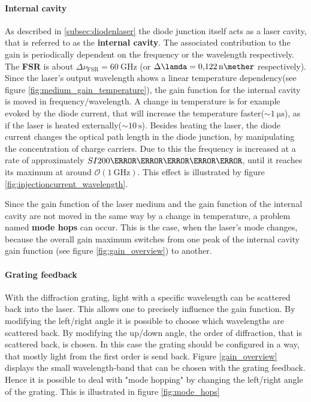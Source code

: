 \paragraph{Internal cavity}
As described in \ref{subsec:diodenlaser} the diode junction itself
acts as a laser cavity, that is referred to as the \textbf{internal cavity}.
The associated contribution to the gain is periodically dependent on
the frequency or the wavelength respectively. The \textbf{FSR} is about
$\Delta\nu_{\text{FSR}} = \SI{60}{\giga\hertz}$ (or
$\Delta\lamda = \SI{0.122}{\nano\mether}$ respectively).
Since the laser's output wavelength shows a linear
temperature dependency(see figure \ref{fig:medium_gain_temperature}),
the gain function for the internal cavity is moved in frequency$/$wavelength.
A change in temperature is for example evoked by the diode current,
that will increase the temperature faster($\sim \SI{1}{\micro\second}$),
as if the laser is heated externally($\sim \SI{10}{\second}$).
Besides heating the laser, the diode current changes the optical
path length in the diode junction, by manipulating the concentration
of charge carriers. Due to this the frequency is increased at a rate of
approximately $SI{200}{\mega\hertz\per\milli\ampere}$, until it reaches
its maximum at around $\mathcal{O}(\SI{1}{\giga\hertz})$.
This effect is illustrated by figure \ref{fig:injectioncurrent_wavelength}.


Since the gain function of the laser medium and the gain function of
the internal cavity are not moved in the same way by a change in temperature,
a problem named \textbf{mode hops} can occur. This is the case,
when the laser's mode changes, because the overall gain maximum
switches from one peak of the internal cavity
gain function (see figure \ref{fig:gain_overview}) to another.



\paragraph{Grating feedback}
With the diffraction grating, light with a specific wavelength
can be scattered back into the laser. This allows one to precisely
influence the gain function. By modifying the left/right angle
it is possible to choose which wavelengths are scattered back.
By modifying the up/down angle, the order of diffraction, that
is scattered back, is chosen. In this case the grating
should be configured in a way, that mostly light from
the first order is send back. Figure \ref{gain_overview}
displays the small wavelength-band that can be chosen with
the grating feedback. Hence it is possible to deal with "mode hopping"
by changing the left/right angle of the grating. This is illustrated
in figure \ref{fig:mode_hops}


